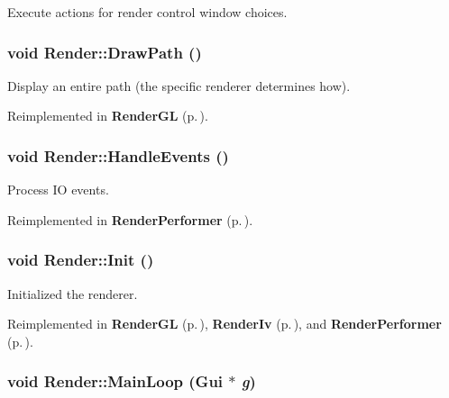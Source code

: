 Execute actions for render control window choices.

\subsubsection{\setlength{\rightskip}{0pt plus 5cm}void Render::Draw\-Path ()\hspace{0.3cm}{\tt  [inline, virtual]}}\label{classRender_a12}


Display an entire path (the specific renderer determines how).



Reimplemented in {\bf Render\-GL} {\rm (p.\,\pageref{classRenderGL_b11})}.
\subsubsection{\setlength{\rightskip}{0pt plus 5cm}void Render::Handle\-Events ()\hspace{0.3cm}{\tt  [inline, virtual]}}\label{classRender_a5}


Process IO events.



Reimplemented in {\bf Render\-Performer} {\rm (p.\,\pageref{classRenderPerformer_a5})}.
\subsubsection{\setlength{\rightskip}{0pt plus 5cm}void Render::Init ()\hspace{0.3cm}{\tt  [virtual]}}\label{classRender_a4}


Initialized the renderer.



Reimplemented in {\bf Render\-GL} {\rm (p.\,\pageref{classRenderGL_a5})}, {\bf Render\-Iv} {\rm (p.\,\pageref{classRenderIv_a5})}, and {\bf Render\-Performer} {\rm (p.\,\pageref{classRenderPerformer_a4})}.
\subsubsection{\setlength{\rightskip}{0pt plus 5cm}void Render::Main\-Loop ({\bf Gui} $\ast$ {\em g})\hspace{0.3cm}{\tt  [virtual]}}\label{classRender_a6}


